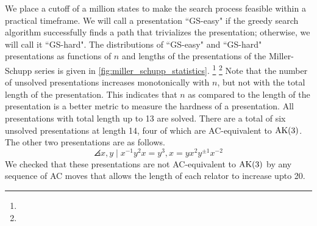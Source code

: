 We place a cutoff of a million states to make the search process feasible within a practical timeframe. We will call a presentation ``GS-easy" if the greedy search algorithm successfully finds a path that trivializes the presentation; otherwise, we will call it ``GS-hard". The distributions of ``GS-easy" and ``GS-hard" presentations as functions of $n$ and lengths of the presentations of the Miller-Schupp series is given in \autoref{fig:miller_schupp_statistics}. 
\footnote{}
\footnote{}
Note that the number of unsolved presentations increases monotonically with $n$, but not with the total length of the presentation. This indicates that $n$ as compared to the length of the presentation is a better metric to measure the hardness of a presentation. 
All presentations with total length up to 13 are solved. 
There are a total of six unsolved presentations at length 14, four of which are AC-equivalent to $\text{AK}(3)$. The other two presentations are as follows. 
\[
\angles{x, y \mid x^{-1} y^2 x = y^{3} , x = y x^2 y^{\pm 1} x^{-2}}
\]
We checked that these presentations are not AC-equivalent to $\text{AK}(3)$ by any sequence of AC moves that allows the length of each relator to increase upto 20.







